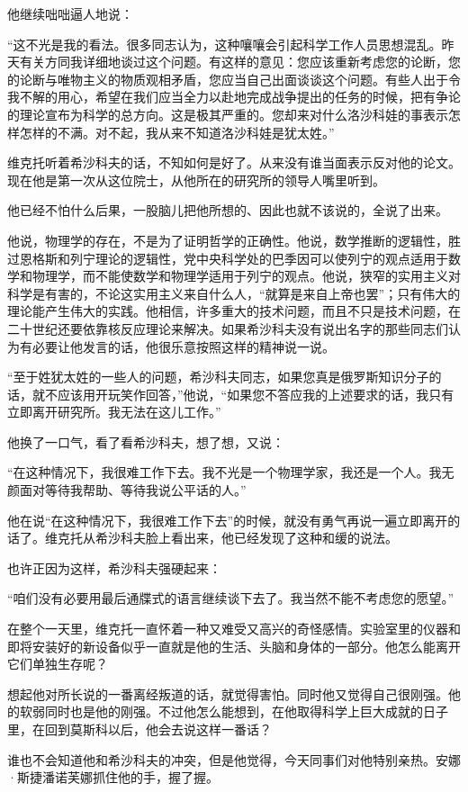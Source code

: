 他继续咄咄逼人地说：

“这不光是我的看法。很多同志认为，这种嚷嚷会引起科学工作人员思想混乱。昨天有关方同我详细地谈过这个问题。有这样的意见：您应该重新考虑您的论断，您的论断与唯物主义的物质观相矛盾，您应当自己出面谈谈这个问题。有些人出于令我不解的用心，希望在我们应当全力以赴地完成战争提出的任务的时候，把有争论的理论宣布为科学的总方向。这是极其严重的。您却来对什么洛沙科娃的事表示怎样怎样的不满。对不起，我从来不知道洛沙科娃是犹太姓。”

维克托听着希沙科夫的话，不知如何是好了。从来没有谁当面表示反对他的论文。现在他是第一次从这位院士，从他所在的研究所的领导人嘴里听到。

他已经不怕什么后果，一股脑儿把他所想的、因此也就不该说的，全说了出来。

他说，物理学的存在，不是为了证明哲学的正确性。他说，数学推断的逻辑性，胜过恩格斯和列宁理论的逻辑性，党中央科学处的巴季因可以使列宁的观点适用于数学和物理学，而不能使数学和物理学适用于列宁的观点。他说，狭窄的实用主义对科学是有害的，不论这实用主义来自什么人，“就算是来自上帝也罢”；只有伟大的理论能产生伟大的实践。他相信，许多重大的技术问题，而且不只是技术问题，在二十世纪还要依靠核反应理论来解决。如果希沙科夫没有说出名字的那些同志们认为有必要让他发言的话，他很乐意按照这样的精神说一说。

“至于姓犹太姓的一些人的问题，希沙科夫同志，如果您真是俄罗斯知识分子的话，就不应该用开玩笑作回答，”他说，“如果您不答应我的上述要求的话，我只有立即离开研究所。我无法在这儿工作。”

他换了一口气，看了看希沙科夫，想了想，又说：

“在这种情况下，我很难工作下去。我不光是一个物理学家，我还是一个人。我无颜面对等待我帮助、等待我说公平话的人。”

他在说“在这种情况下，我很难工作下去”的时候，就没有勇气再说一遍立即离开的话了。维克托从希沙科夫脸上看出来，他已经发现了这种和缓的说法。

也许正因为这样，希沙科夫强硬起来：

“咱们没有必要用最后通牒式的语言继续谈下去了。我当然不能不考虑您的愿望。”

在整个一天里，维克托一直怀着一种又难受又高兴的奇怪感情。实验室里的仪器和即将安装好的新设备似乎一直就是他的生活、头脑和身体的一部分。他怎么能离开它们单独生存呢？

想起他对所长说的一番离经叛道的话，就觉得害怕。同时他又觉得自己很刚强。他的软弱同时也是他的刚强。不过他怎么能想到，在他取得科学上巨大成就的日子里，在回到莫斯科以后，他会去说这样一番话？

谁也不会知道他和希沙科夫的冲突，但是他觉得，今天同事们对他特别亲热。安娜·斯捷潘诺芙娜抓住他的手，握了握。

